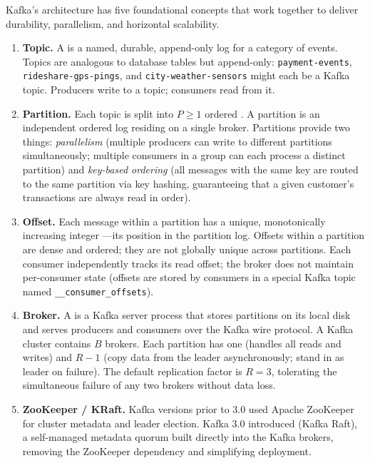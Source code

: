 Kafka's architecture has five foundational concepts that work together to
deliver durability, parallelism, and horizontal scalability.

\begin{enumerate}
  \item \textbf{Topic.} A  is a named, durable, append-only log
        for a category of events. Topics are analogous to database tables
        but append-only: \texttt{payment-events}, \texttt{rideshare-gps-pings},
        and \texttt{city-weather-sensors} might each be a Kafka topic.
        Producers write to a topic; consumers read from it.

  \item \textbf{Partition.} Each topic is split into $P \geq 1$ ordered
        . A partition is an independent ordered log residing
        on a single broker. Partitions provide two things:
        \emph{parallelism} (multiple producers can write to different
        partitions simultaneously; multiple consumers in a group can
        each process a distinct partition) and
        \emph{key-based ordering} (all messages with the same key are
        routed to the same partition via key hashing, guaranteeing that
        a given customer's transactions are always read in order).

  \item \textbf{Offset.} Each message within a partition has a unique,
        monotonically increasing integer ---its position in
        the partition log. Offsets within a partition are dense and
        ordered; they are not globally unique across partitions. Each
        consumer independently tracks its read offset; the broker does
        not maintain per-consumer state (offsets are stored by consumers
        in a special Kafka topic named \texttt{\_\_consumer\_offsets}).

  \item \textbf{Broker.} A  is a Kafka server process that
        stores partitions on its local disk and serves producers and
        consumers over the Kafka wire protocol. A Kafka cluster contains
        $B$ brokers. Each partition has one  (handles
        all reads and writes) and $R-1$  (copy
        data from the leader asynchronously; stand in as leader on
        failure). The default replication factor is $R=3$, tolerating
        the simultaneous failure of any two brokers without data loss.

  \item \textbf{ZooKeeper / KRaft.} Kafka versions prior to 3.0 used
        Apache ZooKeeper for cluster metadata and leader election.
        Kafka 3.0 introduced  (Kafka Raft), a self-managed
        metadata quorum built directly into the Kafka brokers, removing
        the ZooKeeper dependency and simplifying deployment.
\end{enumerate}

